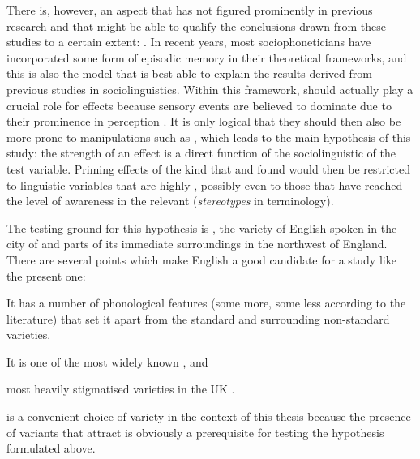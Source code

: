 There is, however, an aspect that has not figured prominently in previous research and that might be able to qualify the conclusions drawn from these studies to a certain extent: .
In recent years, most sociophoneticians have incorporated some form of episodic memory in their theoretical frameworks, and this is also the model that is best able to explain the results derived from previous  studies in sociolinguistics.
Within this framework,  should actually play a crucial role for  effects because  sensory events are believed to dominate  due to their prominence in perception \parencite[cf.][]{pierrehumbert2006}.
It is only logical that they should then also be more prone to manipulations such as , which leads to the main hypothesis of this study: the strength of an   effect is a direct function of the sociolinguistic  of the test variable.
Priming effects of the kind that \citeauthor{niedzielski1999} and \citeauthor{hayetal2006a} found would then be restricted to linguistic variables that are highly , possibly even to those that have reached the level of  awareness in the relevant  (\emph{stereotypes} in  terminology).

The testing ground for this hypothesis is , the variety of English spoken in the city of  and parts of its immediate surroundings in the northwest of England.
There are several points which make  English a good candidate for a study like the present one:
\begin{inparaenum}[(1)]
	\item It has a number of phonological features (some more, some less  according to the literature) that set it apart from the standard and surrounding non-standard varieties.
	\item It is one of the most widely known \parencite[cf.][]{trudgill1999}, and
	\item most heavily stigmatised varieties in the UK \parencite[cf.][]{montgomery2007}.
\end{inparaenum}
 is a convenient choice of variety in the context of this thesis because the presence of variants that attract  is obviously a prerequisite for testing the hypothesis formulated above.

